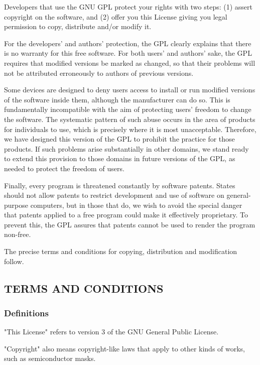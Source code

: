 \documentclass{ctexart}
\begin{document}
  Developers that use the GNU GPL protect your rights with two steps:
(1) assert copyright on the software, and (2) offer you this License
giving you legal permission to copy, distribute and/or modify it.

  For the developers' and authors' protection, the GPL clearly explains
that there is no warranty for this free software.  For both users' and
authors' sake, the GPL requires that modified versions be marked as
changed, so that their problems will not be attributed erroneously to
authors of previous versions.

  Some devices are designed to deny users access to install or run
modified versions of the software inside them, although the manufacturer
can do so.  This is fundamentally incompatible with the aim of
protecting users' freedom to change the software.  The systematic
pattern of such abuse occurs in the area of products for individuals to
use, which is precisely where it is most unacceptable.  Therefore, we
have designed this version of the GPL to prohibit the practice for those
products.  If such problems arise substantially in other domains, we
stand ready to extend this provision to those domains in future versions
of the GPL, as needed to protect the freedom of users.

  Finally, every program is threatened constantly by software patents.
States should not allow patents to restrict development and use of
software on general-purpose computers, but in those that do, we wish to
avoid the special danger that patents applied to a free program could
make it effectively proprietary.  To prevent this, the GPL assures that
patents cannot be used to render the program non-free.

  The precise terms and conditions for copying, distribution and
modification follow.

\subsection*{TERMS AND CONDITIONS}

\setcounter{thesubsubsection}{-1}
\subsubsection{Definitions}

  "This License" refers to version 3 of the GNU General Public License.

  "Copyright" also means copyright-like laws that apply to other kinds of
works, such as semiconductor masks.
\end{document}
